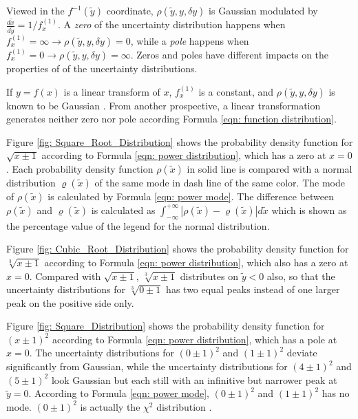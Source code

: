 \documentclass[twoside]{article}
\numberwithin{equation}{section}
\begin{document}
Viewed in the $f^{-1}(\tilde{y})$ coordinate, $\rho(\tilde{y}, y, \delta y)$ is Gaussian modulated by $\frac{d\tilde{x}}{d\tilde{y}} = 1/f^{(1)}_x$.
A \emph{zero} of the uncertainty distribution happens when $f^{(1)}_x=\infty \rightarrow \rho(\tilde{y}, y, \delta y) = 0$, while a \emph{pole} happens when $f^{(1)}_x=0 \rightarrow \rho(\tilde{y}, y, \delta y) = \infty$.
Zeros and poles have different impacts on the properties of of the uncertainty distributions.

If $y=f(x)$ is a linear transform of $x$, $f^{(1)}_x$ is a constant, and $\rho(\tilde{y}, y, \delta y)$ is known to be Gaussian \cite{Probability_Statistics}.
From another prospective, a linear transformation generates neither zero nor pole according Formula \eqref{eqn: function distribution}.

Figure \ref{fig: Square_Root_Distribution} shows the probability density function for $\sqrt{x \pm 1}$ according to Formula \eqref{eqn: power distribution}, which has a zero at $x=0$.
Each probability density function $\rho(\tilde{x})$ in solid line is compared with a normal distribution $\varrho(\tilde{x})$ of the same mode in dash line of the same color.
The mode of $\rho(\tilde{x})$ is calculated by Formula \eqref{eqn: power mode}.
The difference between $\rho(\tilde{x})$ and $\varrho(\tilde{x})$ is calculated as $\int_{-\infty}^{+\infty} |\rho(\tilde{x}) - \varrho(\tilde{x})| d \tilde{x}$ which is shown as the percentage value of the legend for the normal distribution.

Figure \ref{fig: Cubic_Root_Distribution} shows the probability density function for $\sqrt[3]{x \pm 1}$ according to Formula \eqref{eqn: power distribution}, which also has a zero at $x=0$.
Compared with $\sqrt{x \pm 1}$, $\sqrt[3]{x \pm 1}$ distributes on $\tilde{y} < 0$ also, so that the uncertainty distributions for $\sqrt[3]{0 \pm 1}$ has two equal peaks instead of one larger peak on the positive side only.

Figure \ref{fig: Square_Distribution} shows the probability density function for $(x \pm 1)^2$ according to Formula \eqref{eqn: power distribution}, which has a pole at $x=0$.
The uncertainty distributions for $(0 \pm 1)^2$ and $(1 \pm 1)^2$ deviate significantly from Gaussian, while the uncertainty distributions for $(4 \pm 1)^2$ and $(5 \pm 1)^2$ look Gaussian but each still with an infinitive but narrower peak at $\tilde{y} = 0$.
According to Formula \eqref{eqn: power mode}, $(0 \pm 1)^2$ and $(1 \pm 1)^2$ has no mode.
$(0 \pm 1)^2$ is actually the $\chi^2$ distribution \cite{Statistical_Methods}.
\end{document}
